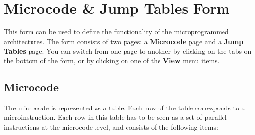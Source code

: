 \documentclass{article}
\begin{document}
\section{Microcode \& Jump Tables Form}
This form can be used to define the functionality of the microprogrammed architectures. The form consists of two pages: a
\textbf{Microcode} page and a \textbf{Jump Tables} page. You can switch from one page to another by clicking on the tabs on the bottom of the form, or by clicking on one of the \textbf{View} menu items.

\subsection{Microcode}
The microcode is represented as a table. Each row of the table corresponds to a microinstruction. Each row in this
table has to be seen as a set of parallel instructions at the microcode level, and consists of the following items:
\end{document}
